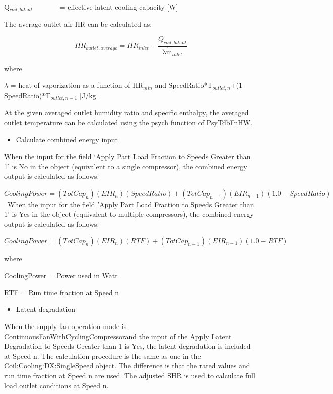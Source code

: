 Q\(_{coil,latent}\)~~~~~~~ = effective latent cooling capacity {[}W{]}

The average outlet air HR can be calculated as:

\begin{equation}
  HR_{outlet,average} = HR_{inlet} - \frac{Q_{coil,latent}}{{\mathop {\lambda m}\limits^\cdot  }_{inlet}}
\end{equation}

where

\(\lambda\) = heat of vaporization as a function of HR\(_{min}\) and SpeedRatio*T\(_{outlet,n}\)+(1-SpeedRatio)*T\(_{outlet,n-1}\) {[}J/kg{]}

At the given averaged outlet humidity ratio and specific enthalpy, the averaged outlet temperature can be calculated using the psych function of PsyTdbFnHW.

\begin{itemize}
  \item Calculate combined energy input
\end{itemize}

When the input for the field `Apply Part Load Fraction to Speeds Greater than 1' is No in the object (equivalent to a single compressor), the combined energy output is calculated as follows:

\(CoolingPower = (TotCa{p_n})(EI{R_n})(SpeedRatio) + (TotCa{p_{n - 1}})(EI{R_{n - 1}})(1.0 - SpeedRatio)\) ~When the input for the field 'Apply Part Load Fraction to Speeds Greater than 1' is Yes in the object (equivalent to multiple compressors), the combined energy output is calculated as follows:

\begin{equation}
CoolingPower = (TotCa{p_n})(EI{R_n})(RTF) + (TotCa{p_{n - 1}})(EI{R_{n - 1}})(1.0 - RTF)
\end{equation}

where

CoolingPower = Power used in Watt

RTF = Run time fraction at Speed n

\begin{itemize}
  \item Latent degradation
\end{itemize}

When the supply fan operation mode is ContinuousFanWithCyclingCompressorand the input of the Apply Latent Degradation to Speeds Greater than 1 is Yes, the latent degradation is included at Speed n. The calculation procedure is the same as one in the Coil:Cooling:DX:SingleSpeed object. The difference is that the rated values and run time fraction at Speed n are used. The adjusted SHR is used to calculate full load outlet conditions at Speed n.

